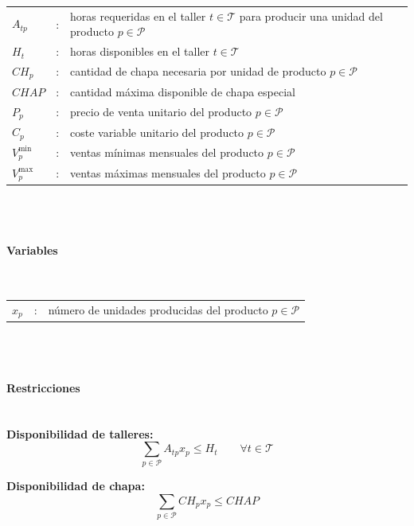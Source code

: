 \begin{tabular}{l c l}
    $A_{tp}$  & : & horas requeridas en el taller $t \in \mathcal{T}$ para producir una unidad del producto $p \in \mathcal{P}$ \\
    $H_t$     & : & horas disponibles en el taller $t \in \mathcal{T}$ \\
    $CH_p$    & : & cantidad de chapa necesaria por unidad de producto $p \in \mathcal{P}$ \\
    $CHAP$    & : & cantidad máxima disponible de chapa especial \\
    $P_p$     & : & precio de venta unitario del producto $p \in \mathcal{P}$ \\
    $C_p$     & : & coste variable unitario del producto $p \in \mathcal{P}$ \\
    $V^{\min}_p$ & : & ventas mínimas mensuales del producto $p \in \mathcal{P}$ \\
    $V^{\max}_p$ & : & ventas máximas mensuales del producto $p \in \mathcal{P}$ \\
\end{tabular}
\\
\\

\paragraph{Variables}\mbox{}\\

\begin{tabular}{l c l}
    $x_p$  & : & número de unidades producidas del producto $p \in \mathcal{P}$ \\
\end{tabular}
\\
\\

\paragraph{Restricciones}\mbox{}\\

\noindent
\textbf{Disponibilidad de talleres:}
\begin{equation}
    \sum_{p \in \mathcal{P}} A_{tp} x_p \leq H_t \qquad \forall t \in \mathcal{T}
\end{equation}

\noindent
\textbf{Disponibilidad de chapa:}
\begin{equation}
    \sum_{p \in \mathcal{P}} CH_p x_p \leq CHAP
\end{equation}


